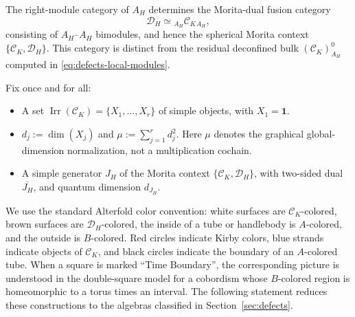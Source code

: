 \documentclass[12pt]{amsart}
\numberwithin{equation}{section}
\theoremstyle{definition}
\begin{document}
The right-module category of $A_H$ determines the Morita-dual fusion
category \cite{mueger2003-1,mueger2003-2}
$$
\mathcal D_H\simeq{}_{A_H}\mathcal C_K{}_{A_H},
$$
consisting of $A_H$--$A_H$ bimodules, and hence the spherical Morita
context $\{\mathcal C_K,\mathcal D_H\}$. This category is distinct from
the residual deconfined bulk $(\mathcal C_K)^0_{A_H}$ computed in
\eqref{eq:defects-local-modules}.

Fix once and for all:
\begin{itemize}
\item A set $\operatorname{Irr}(\mathcal C_K)=\{X_1,\dots,X_r\}$ of simple objects, with $X_1=\mathbf 1$.
\item $d_j:=\dim(X_j)$ and $\mu:=\sum_{j=1}^r d_j^2$. Here $\mu$ denotes the graphical global-dimension normalization, not a multiplication cochain.
\item A simple generator $J_H$ of the Morita context $\{\mathcal C_K,\mathcal D_H\}$,
  with two-sided dual $\overline{J_H}$, and quantum dimension $d_{J_H}$.
\end{itemize}

We use the standard Alterfold color convention: white surfaces are $\mathcal C_K$-colored, brown surfaces are $\mathcal D_H$-colored, the inside of a tube or handlebody is $A$-colored, and the outside is $B$-colored. Red circles indicate Kirby colors, blue strands indicate objects of $\mathcal C_K$, and black circles indicate the boundary of an $A$-colored tube.  When a square is marked ``Time Boundary'', the corresponding picture is understood in the double-square model for a cobordism whose $B$-colored region is homeomorphic to a torus times an interval. The following statement reduces these constructions to the algebras classified in Section~\ref{sec:defects}.
\end{document}
